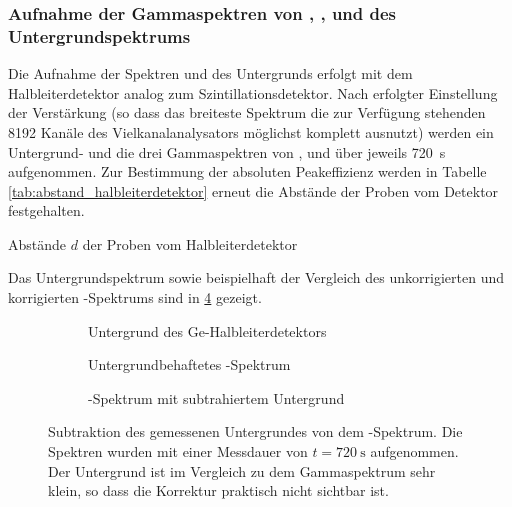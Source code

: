 \documentclass[11pt, a4paper]{article}
\numberwithin{equation}{section}
\newcommand{\co}{\isotope[60]{Co}}
\newcommand{\cs}{\isotope[137]{Cs}}
\begin{document}
\subsubsection{Aufnahme der Gammaspektren von , ,  und des Untergrundspektrums}
Die Aufnahme der Spektren und des Untergrunds erfolgt mit dem Halbleiterdetektor analog zum Szintillationsdetektor.
Nach erfolgter Einstellung der Verstärkung (so dass das breiteste Spektrum die zur Verfügung stehenden 8192 Kanäle des Vielkanalanalysators möglichst komplett ausnutzt) werden ein Untergrund- und die drei Gammaspektren von \co{}, \cs{} und  über jeweils \SI{720}{\second} aufgenommen.
Zur Bestimmung der absoluten Peakeffizienz werden in Tabelle \ref{tab:abstand_halbleiterdetektor} erneut die Abstände der Proben vom Detektor festgehalten.
\begin{table}[h]
	\centering
	
	\caption{Abstände $d$ der Proben vom Halbleiterdetektor}
	\label{tab:abstand_halbleiterdetektor}
\end{table}
Das Untergrundspektrum sowie beispielhaft der Vergleich des unkorrigierten und korrigierten \cs-Spektrums sind in \ref{fig:abzug_untergrund_halb} gezeigt.
\begin{figure}[hp]
	\centering
	\begin{subfigure}[b]{0.65\textwidth}
		\resizebox{!}{0.275\textheight}{
			
		}
		\caption{Untergrund des Ge-Halbleiterdetektors}
		\label{fig:untergrund_halb}
	\end{subfigure}
	
	\begin{subfigure}[b]{0.65\textwidth}
		\resizebox{!}{0.275\textheight}{
			
		}
		\caption{Untergrundbehaftetes -Spektrum}
		\label{fig:caesium_mit_untergrund}
	\end{subfigure}
	
	\begin{subfigure}[b]{0.65\textwidth}
		\resizebox{!}{0.275\textheight}{
			
		}
		\caption{-Spektrum mit subtrahiertem Untergrund}
		\label{fig:caesium_ohne_untergrund}
	\end{subfigure}
	\caption{Subtraktion des gemessenen Untergrundes von dem -Spektrum. Die Spektren wurden mit einer Messdauer von $t = \SI{720}{\second}$ aufgenommen. Der Untergrund ist im Vergleich zu dem Gammaspektrum sehr klein, so dass die Korrektur praktisch nicht sichtbar ist.}
	\label{fig:abzug_untergrund_halb}
\end{figure}
\end{document}
